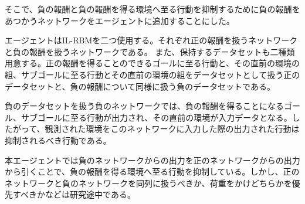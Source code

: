 そこで、負の報酬と負の報酬を得る環境へ至る行動を抑制するために負の報酬をあつかうネットワークをエージェントに追加することにした。

エージェントはIL-RBMを二つ使用する。それぞれ正の報酬を扱うネットワークと負の報酬を扱うネットワークである。
また、保持するデータセットも二種類用意する。正の報酬を得ることのできるゴールに至る行動と、その直前の環境の組、サブゴールに至る行動とその直前の環境の組をデータセットとして扱う正のデータセットと、負の報酬について同様に扱う負のデータセットである。

負のデータセットを扱う負のネットワークでは、負の報酬を得ることになるゴール、サブゴールに至る行動が出力され、その直前の環境が入力データとなる。したがって、観測された環境をこのネットワークに入力した際の出力された行動は抑制されるべき行動である。

本エージェントでは負のネットワークからの出力を正のネットワークからの出力から引くことで、負の報酬を得る環境へ至る行動を抑制している。しかし、正のネットワークと負のネットワークを同列に扱うべきか、荷重をかけどちらかを優先すべきかなどは研究途中である。

